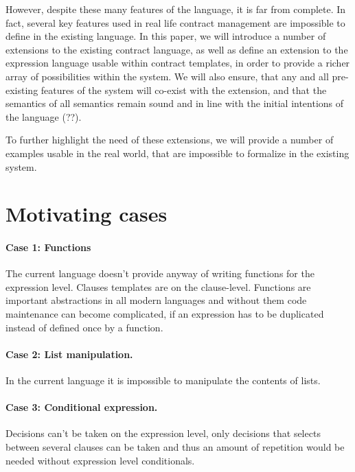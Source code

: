 \documentclass[10pt,a4paper,final,oneside,openany,article]{memoir}
\begin{document}
However, despite these many features of the language, it is far from
complete. In fact, several key features used in real life contract
management are impossible to define in the existing language. In this
paper, we will introduce a number of extensions to the existing contract
language, as well as define an extension to the expression language
usable within contract templates, in order to provide a richer array of
possibilities within the system. We will also ensure, that any and all
pre-existing features of the system will co-exist with the extension,
and that the semantics of all semantics remain sound and in line with
the initial intentions of the language (??).

To further highlight the need of these extensions, we will provide a
number of examples usable in the real world, that are impossible to
formalize in the existing system.


\section{Motivating cases}
\label{motivation}

\paragraph{Case 1: Functions} The current language doesn't provide
anyway of writing functions for the expression level. Clauses
templates are on the clause-level. Functions are important
abstractions in all modern languages and without them code maintenance
can become complicated, if an expression has to be duplicated instead
of defined once by a function.

\paragraph{Case 2: List manipulation.} In the current language it is
impossible to manipulate the contents of lists.

\paragraph{Case 3: Conditional expression.} Decisions can't be taken
on the expression level, only decisions that selects between several
clauses can be taken and thus an amount of repetition would be needed
without expression level conditionals.
\end{document}

